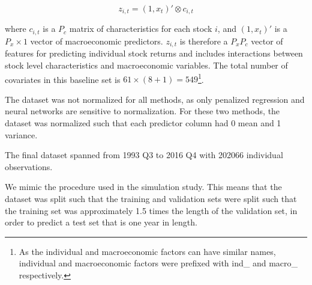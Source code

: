 \documentclass[11pt, a4paper, table]{article}
\begin{document}
\begin{equation}
z_{i,t} = (1, x_t)' \otimes c_{i, t}
\end{equation}

where $c_{i,t}$ is a $P_c$ matrix of characteristics for each stock $i$, and $(1, x_t)'$ is a $P_x \times 1$ vector of macroeconomic predictors. $z_{i,t}$ is therefore a $P_x P_c$ vector of features for predicting individual stock returns and includes interactions between stock level characteristics and macroeconomic variables. The total number of covariates in this baseline set is $61 \times (8 + 1) = 549$\footnote{As the individual and macroeconomic factors can have similar names, individual and macroeconomic factors were prefixed with ind\_ and macro\_ respectively.}.
 

The dataset was not normalized for all methods, as only penalized regression and neural networks are sensitive to normalization. For these two methods, the dataset was normalized such that each predictor column had 0 mean and 1 variance.

The final dataset spanned from 1993 Q3 to 2016 Q4 with 202066 individual observations.

We mimic the procedure used in the simulation study. This means that the dataset was split such that the training and validation sets were split such that the training set was approximately 1.5 times the length of the validation set, in order to predict a test set that is one year in length.
\end{document}
